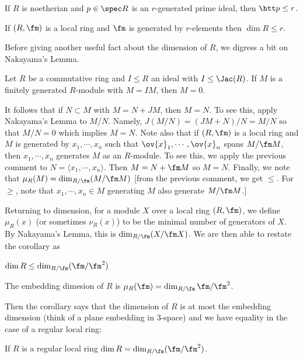 \begin{cor}
If $R$ is noetherian and $p \in \spec R$ is an $r$-generated prime ideal, then $\htt p \leq r$.
\end{cor}

\begin{cor}
If $(R,\fm)$ is a local ring and $\fm$ is generated by $r$-elements then $\dim R \leq r$. 
\end{cor}

Before giving another useful fact about the dimension of $R$, we digress a bit on Nakayama's Lemma.

\begin{lem}[Nakayama]
Let $R$ be a commutative ring and $I \leq R$ an ideal with $I \leq \Jac(R)$. If $M$ is a finitely generated $R$-module with $M=IM$, then $M=0$. 
\end{lem}

It follows that if $N \subset M$ with $M=N+JM$, then $M=N$. To see this, apply Nakayama's Lemma to $M/N$. Namely, $J(M/N)=(JM+N)/N=M/N$ so that $M/N=0$ which implies $M=N$. Note also that if $(R,\fm)$ is a local ring and $M$ is generated by $x_1,\cdots,x_n$ such that $\ov{x}_1,\cdots,\ov{x}_n$ spans $M/\fm M$, then $x_1,\cdots,x_n$ generates $M$ as an $R$-module. To see this, we apply the previous comment to $N=\langle x_1,\cdots,x_n \rangle$. Then $M=N+\fm M$ so $M=N$. Finally, we note that $\mu_R(M)=\dim_{R/\fm}(M/\fm M)$ [from the previous comment, we get $\leq$. For $\geq$, note that $x_1,\cdots,x_n \in M$ generating $M$ also generate $M/\fm M$.] 

Returning to dimension, for a module $X$ over a local ring $(R,\fm)$, we define $\mu_R(x)$ (or sometimes $\nu_R(x)$) to be the minimal number of generators of $X$. By Nakayama's Lemma, this is $\dim_{R/\fm} (X/\fm X)$. We are then able to restate the corollary as

\begin{cor}
$\dim R \leq \dim_{R/\fm}(\fm/\fm^2)$
\end{cor}

\begin{dfn}
The embedding dimesion of $R$ is $\mu_R(\fm)=\dim_{R/\fm} \fm/\fm^2$.
\end{dfn}

Then the corollary says that the dimension of $R$ is at most the embedding dimension (think of a plane embedding in 3-space) and we have equality in the case of a regular local ring:

\begin{dfn}
If $R$ is a regular local ring $\dim R=\dim_{R/\fm}(\fm/\fm^2)$. 
\end{dfn}

